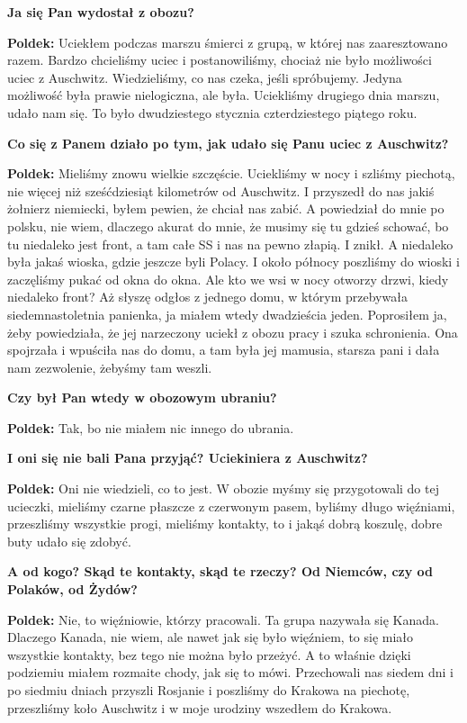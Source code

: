 \begin{otherlanguage}{polish}
\textbf{Ja się Pan wydostał z obozu?}
 
\textbf{Poldek:} Uciekłem podczas marszu śmierci z grupą, w której nas zaaresztowano razem. Bardzo chcieliśmy uciec i postanowiliśmy, chociaż nie było możliwości uciec z Auschwitz. Wiedzieliśmy, co nas czeka, jeśli spróbujemy. Jedyna możliwość była prawie nielogiczna, ale była. Uciekliśmy drugiego dnia marszu, udało nam się. To było dwudziestego stycznia czterdziestego piątego roku.

\textbf{Co się z Panem działo po tym, jak udało się Panu uciec z Auschwitz?}

\textbf{Poldek:}  Mieliśmy znowu wielkie szczęście. Uciekliśmy w nocy i szliśmy piechotą, nie więcej niż sześćdziesiąt kilometrów od Auschwitz. I przyszedł do nas jakiś żołnierz niemiecki, byłem pewien, że chciał nas zabić. A powiedział do mnie po polsku, nie wiem, dlaczego akurat do mnie, że musimy się tu gdzieś schować, bo tu niedaleko jest front, a tam całe SS i nas na pewno złapią. I znikł. A niedaleko była jakaś wioska, gdzie jeszcze byli Polacy. I około północy poszliśmy do wioski i zaczęliśmy pukać od okna do okna. Ale kto we wsi w nocy otworzy drzwi, kiedy niedaleko front? Aż słyszę odgłos z jednego domu, w którym przebywała siedemnastoletnia panienka, ja miałem wtedy dwadzieścia jeden. Poprosiłem ja, żeby powiedziała, że jej narzeczony uciekł z obozu pracy i szuka schronienia. Ona spojrzała i wpuściła nas do domu, a tam była jej mamusia, starsza pani i dała nam zezwolenie, żebyśmy tam weszli.

\textbf{Czy był Pan wtedy w obozowym ubraniu?}

\textbf{Poldek:} Tak, bo nie miałem nic innego do ubrania.
  
\textbf{I oni się nie bali Pana przyjąć? Uciekiniera z Auschwitz?}

\textbf{Poldek:} Oni nie wiedzieli, co to jest. W obozie myśmy się przygotowali do tej ucieczki, mieliśmy czarne płaszcze z czerwonym pasem, byliśmy długo więźniami, przeszliśmy wszystkie progi, mieliśmy kontakty, to i jakąś dobrą koszulę, dobre buty udało się zdobyć.

\textbf{A od kogo? Skąd te kontakty, skąd te rzeczy? Od Niemców, czy od Polaków, od Żydów?}
 
\textbf{Poldek:} Nie, to więźniowie, którzy pracowali. Ta grupa nazywała się Kanada. Dlaczego Kanada, nie wiem, ale nawet jak się było więźniem, to się miało wszystkie kontakty, bez tego nie można było przeżyć. A to właśnie dzięki podziemiu miałem rozmaite chody, jak się to mówi. Przechowali nas siedem dni i po siedmiu dniach przyszli Rosjanie i poszliśmy do Krakowa na piechotę, przeszliśmy koło Auschwitz i w moje urodziny wszedłem do Krakowa. 
 

\end{otherlanguage}
